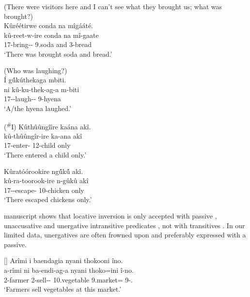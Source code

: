 \documentclass[output=paper]{langscibook}
\begin{document}
\z

\ea
\label{bkm:Ref90039958}
{(There were visitors here and I can’t see what they brought us; what was brought?)}\\
Kûréétirwe conda na mîgááté.\\
\gll
kû-reet-w-ire  conda  na  mî-gaate\\
17\SM{}-bring-\PASS-\PFV{} 9.soda  and  3-bread\\
\glt
‘There was brought soda and bread.’

\z
\pagebreak
\ea
\label{bkm:Ref90039959}
(Who was laughing?)\\
Í g\'{û}kúthekaga mbiti.\\
\gll
ni  kû-ku-thek-ag-a  m-biti\\
\FOC{} 17\SM-\PRS{}-laugh-\HAB-\FV{} 9-hyena\\
\glt
‘A/the hyena laughed.’

\z

\ea
\label{bkm:Ref90039972}
(\textsuperscript{\#}I) Kûthûûngîîre kaána akî.\\
\gll
{} kû-thûûngîr-ire ka-ana akî\\
{} 17\SM{}-enter-\PFV{} 12-child only\\
\glt
‘There entered a child only.’

\z

\ea
\label{bkm:Ref90039973}
Kûratóórookire ng\'{û}k\'{û} akî.\\
\gll
kû-ra-toorook-ire  n-gûkû  akî\\
17\SM{}-\YPST{}-escape-\PFV{} 10-chicken  only\\
\glt
‘There escaped chickens only.’

\z

 manuscript shows that locative inversion is only accepted with passive , unaccusative  and unergative intransitive predicates , not with transitives . In our limited data, unergatives are often frowned upon and preferably expressed with a passive.

 
\ea
\label{bkm:Ref94458432} 
\citep[8, glosses adapted]{BuellMuriungi2008}
\ea
[]{
Arîmi i baendagia nyani thokooni îno.\\
\gll
a-rîmi  ni  ba-endi-ag-a  nyani  thoko=ini  î-no.\\
2-farmer \FOC{} 2\SM{}-sell-\HAB-\FV{} 10.vegetable  9.market=\LOC{} 9-\DEM.\PROX{}\\
\glt
‘Farmers sell vegetables at this market.’
}
\end{document}
